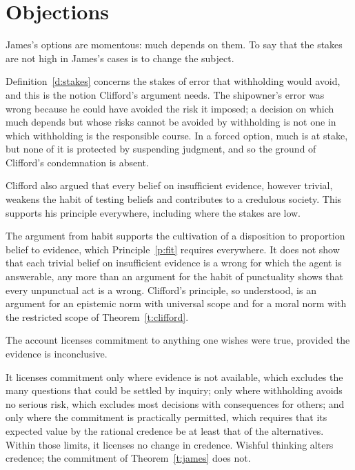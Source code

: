 \documentclass{situationist-preprint}
\begin{document}
\section{Objections}

\begin{objection}
James's options are momentous: much depends on them. To say that the stakes are not high in James's cases is to change the subject.
\end{objection}

\begin{reply}
Definition~\ref{d:stakes} concerns the stakes of error that withholding would avoid, and this is the notion Clifford's argument needs. The shipowner's error was wrong because he could have avoided the risk it imposed; a decision on which much depends but whose risks cannot be avoided by withholding is not one in which withholding is the responsible course. In a forced option, much is at stake, but none of it is protected by suspending judgment, and so the ground of Clifford's condemnation is absent.
\end{reply}

\begin{objection}
Clifford also argued that every belief on insufficient evidence, however trivial, weakens the habit of testing beliefs and contributes to a credulous society. This supports his principle everywhere, including where the stakes are low.
\end{objection}

\begin{reply}
The argument from habit supports the cultivation of a disposition to proportion belief to evidence, which Principle~\ref{p:fit} requires everywhere. It does not show that each trivial belief on insufficient evidence is a wrong for which the agent is answerable, any more than an argument for the habit of punctuality shows that every unpunctual act is a wrong. Clifford's principle, so understood, is an argument for an epistemic norm with universal scope and for a moral norm with the restricted scope of Theorem~\ref{t:clifford}.
\end{reply}

\begin{objection}
The account licenses commitment to anything one wishes were true, provided the evidence is inconclusive.
\end{objection}

\begin{reply}
It licenses commitment only where evidence is not available, which excludes the many questions that could be settled by inquiry; only where withholding avoids no serious risk, which excludes most decisions with consequences for others; and only where the commitment is practically permitted, which requires that its expected value by the rational credence be at least that of the alternatives. Within those limits, it licenses no change in credence. Wishful thinking alters credence; the commitment of Theorem~\ref{t:james} does not.
\end{reply}
\end{document}
